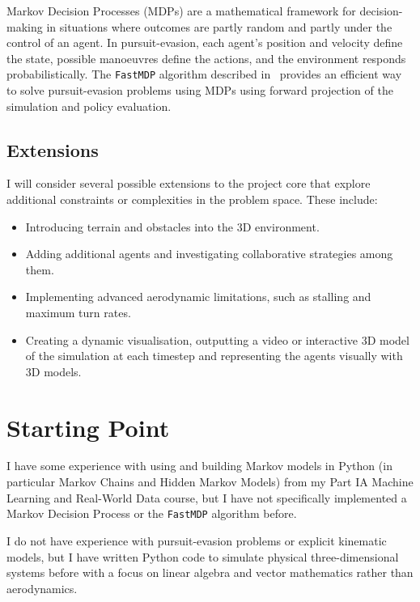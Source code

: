 \documentclass[12pt,a4paper,twoside]{article}
\begin{document}
Markov Decision Processes (MDPs) are a mathematical framework for decision-making in situations where outcomes are partly random and partly under the control of an agent. In pursuit-evasion, each agent's position and velocity define the state, possible manoeuvres define the actions, and the environment responds probabilistically. 
The \texttt{FastMDP} algorithm described in~\cite{BertramWei2021} provides an efficient way to solve pursuit-evasion problems using MDPs using forward projection of the simulation and policy evaluation.

\subsection*{Extensions}

I will consider several possible extensions to the project core that explore additional constraints or complexities in the problem space. These include:
\begin{itemize}
    \item Introducing terrain and obstacles into the 3D environment.  
    \item Adding additional agents and investigating collaborative strategies among them.  
    \item Implementing advanced aerodynamic limitations, such as stalling and maximum turn rates.  
    \item Creating a dynamic visualisation, outputting a video or interactive 3D model of the simulation at each timestep and representing the agents visually with 3D models.
\end{itemize}

\newpage


\section{Starting Point}

I have some experience with using and building Markov models in Python (in particular Markov Chains and Hidden Markov Models) from my Part IA Machine Learning and Real-World Data course, but I have not specifically implemented a Markov Decision Process or the \texttt{FastMDP} algorithm before.

I do not have experience with pursuit-evasion problems or explicit kinematic models, but I have written Python code to simulate physical three-dimensional systems before with a focus on linear algebra and vector mathematics rather than aerodynamics.
\end{document}
